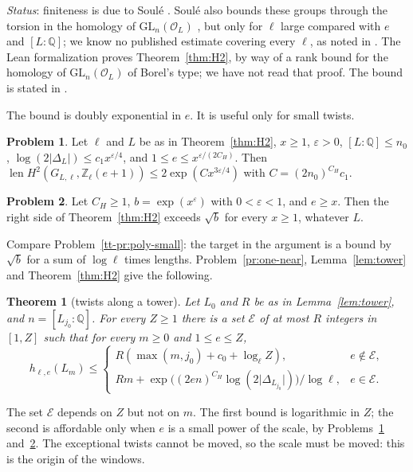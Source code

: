 \documentclass[reqno]{amsart}
\theoremstyle{definition}
\newtheorem{problem}{Problem}[section]
\theoremstyle{plain}
\newtheorem{theorem}{Theorem}[section]
\theoremstyle{remark}
\newcommand{\Z}{\mathbb{Z}}
\newcommand{\Q}{\mathbb{Q}}
\newcommand{\Zl}{\Z_\ell}
\newcommand{\Oc}{\mathcal{O}}
\newcommand{\len}{\operatorname{len}}
\begin{document}
\noindent\emph{Status}: finiteness is due to Soul\'e \cite{So79}.  Soul\'e also bounds these groups through the torsion in the homology of \(\mathrm{GL}_n(\Oc_L)\) \cite{So03}, but only for \(\ell\) large compared with \(e\) and \([L:\Q]\); we know no published estimate covering every \(\ell\), as noted in \cite[\S III.9]{Rub}.  The Lean formalization proves Theorem~\ref{thm:H2}, by way of a rank bound for the homology of \(\mathrm{GL}_n(\Oc_L)\) of Borel's type; we have not read that proof.  The bound is stated in \cite[\S5.5]{Zh}.

The bound is doubly exponential in \(e\).  It is useful only for small twists.

\begin{problem}\label{pr:H2-small}
Let \(\ell\) and \(L\) be as in Theorem~\ref{thm:H2}, \(x\ge1\), \(\varepsilon>0\), \([L:\Q]\le n_0\), \(\log(2\lvert\Delta_L\rvert)\le c_1x^{\varepsilon/4}\), and \(1\le e\le x^{\varepsilon/(2C_H)}\).  Then \(\len H^2(G_{L,\ell},\Zl(e+1))\le2\exp(Cx^{3\varepsilon/4})\) with \(C=(2n_0)^{C_H}c_1\).
\end{problem}

\begin{problem}\label{pr:H2-large}
Let \(C_H\ge1\), \(b=\exp(x^\varepsilon)\) with \(0<\varepsilon<1\), and \(e\ge x\).  Then the right side of Theorem~\ref{thm:H2} exceeds \(\sqrt b\) for every \(x\ge1\), whatever \(L\).
\end{problem}

Compare Problem~\ref{tt-pr:poly-small}: the target in the argument is a bound by \(\sqrt b\) for a sum of \(\log\ell\) times lengths.  Problem~\ref{pr:one-near}, Lemma~\ref{lem:tower} and Theorem~\ref{thm:H2} give the following.

\begin{theorem}[twists along a tower]\label{thm:point}
Let \(L_0\) and \(R\) be as in Lemma~\ref{lem:tower}, and \(n=[L_{j_0}:\Q]\).  For every \(Z\ge1\) there is a set \(\mathcal E\) of at most \(R\) integers in \([1,Z]\) such that for every \(m\ge0\) and \(1\le e\le Z\),
\[
 h_{\ell,e}(L_m)\le
 \begin{cases}
 R(\max(m,j_0)+c_0+\log_\ell Z), & e\notin\mathcal E,\\
 Rm+\exp\bigl((2en)^{C_H}\log(2\lvert\Delta_{L_{j_0}}\rvert)\bigr)/\log\ell, & e\in\mathcal E.
 \end{cases}
\]
\end{theorem}

The set \(\mathcal E\) depends on \(Z\) but not on \(m\).  The first bound is logarithmic in \(Z\); the second is affordable only when \(e\) is a small power of the scale, by Problems~\ref{pr:H2-small} and~\ref{pr:H2-large}.  The exceptional twists cannot be moved, so the scale must be moved: this is the origin of the windows.
\end{document}
